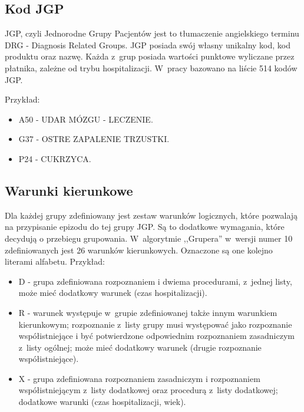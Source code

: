 
\subsection{Kod JGP}
\label{sec:kodJGP}

JGP, czyli Jednorodne Grupy Pacjentów jest to tłumaczenie angielskiego terminu DRG - Diagnosis Related Groups.
JGP posiada swój własny unikalny kod, kod produktu oraz nazwę. Każda z~grup posiada wartości punktowe wyliczane przez płatnika, zależne od trybu hospitalizacji. W~pracy bazowano na liście 514 kodów JGP\cite{plik_parametryzujacy}.

Przykład:
\begin{itemize}
\item A50 - UDAR MÓZGU - LECZENIE.
\item G37 - OSTRE ZAPALENIE TRZUSTKI.
\item P24 - CUKRZYCA.
\end{itemize}


\subsection{Warunki kierunkowe}
\label{sec:warunkiKierunkowe}

Dla każdej grupy zdefiniowany jest zestaw warunków logicznych, które pozwalają na przypisanie epizodu do tej grupy JGP. Są to dodatkowe wymagania, które decydują o przebiegu grupowania. W~algorytmie ,,Grupera'' w~wersji numer 10 zdefiniowanych jest 26 warunków kierunkowych. Oznaczone są one kolejno literami alfabetu\cite{algorytm_grupera}.
Przykład:
\begin{itemize}
\item D - grupa zdefiniowana rozpoznaniem i dwiema procedurami, z~jednej listy, może mieć dodatkowy warunek (czas hospitalizacji).
\item R - warunek występuje w~grupie zdefiniowanej także innym warunkiem kierunkowym; rozpoznanie z~listy grupy musi występować jako rozpoznanie współistniejące i być potwierdzone odpowiednim rozpoznaniem zasadniczym z~listy ogólnej; może mieć dodatkowy warunek (drugie rozpoznanie współistniejące).
\item X - grupa zdefiniowana rozpoznaniem zasadniczym i rozpoznaniem współistniejącym z~listy dodatkowej oraz procedurą z~listy dodatkowej; dodatkowe warunki (czas hospitalizacji, wiek).
\end{itemize}

